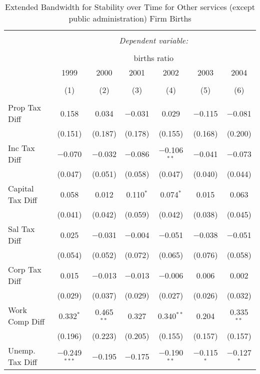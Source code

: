 
\begin{table}[!htbp] \centering 
  \caption{Extended Bandwidth for Stability over Time for  Other services (except public administration) Firm Births} 
  \label{81 ebyear} 
\small 
\begin{tabular}{@{\extracolsep{5pt}}lcccccc} 
\\[-1.8ex]\hline 
\hline \\[-1.8ex] 
 & \multicolumn{6}{c}{\textit{Dependent variable:}} \\ 
\cline{2-7} 
\\[-1.8ex] & \multicolumn{6}{c}{births ratio} \\ 
 & 1999 & 2000 & 2001 & 2002 & 2003 & 2004 \\ 
\\[-1.8ex] & (1) & (2) & (3) & (4) & (5) & (6)\\ 
\hline \\[-1.8ex] 
 Prop Tax Diff & 0.158 & 0.034 & $-$0.031 & 0.029 & $-$0.115 & $-$0.081 \\ 
  & (0.151) & (0.187) & (0.178) & (0.155) & (0.168) & (0.200) \\ 
  Inc Tax Diff & $-$0.070 & $-$0.032 & $-$0.086 & $-$0.106$^{**}$ & $-$0.041 & $-$0.073 \\ 
  & (0.047) & (0.051) & (0.058) & (0.047) & (0.040) & (0.044) \\ 
  Capital Tax Diff & 0.058 & 0.012 & 0.110$^{*}$ & 0.074$^{*}$ & 0.015 & 0.063 \\ 
  & (0.041) & (0.042) & (0.059) & (0.042) & (0.038) & (0.045) \\ 
  Sal Tax Diff & 0.025 & $-$0.031 & $-$0.004 & $-$0.051 & $-$0.038 & $-$0.051 \\ 
  & (0.054) & (0.052) & (0.072) & (0.065) & (0.076) & (0.058) \\ 
  Corp Tax Diff & 0.015 & $-$0.013 & $-$0.013 & $-$0.006 & 0.006 & 0.002 \\ 
  & (0.029) & (0.037) & (0.029) & (0.027) & (0.026) & (0.032) \\ 
  Work Comp Diff & 0.332$^{*}$ & 0.465$^{**}$ & 0.327 & 0.340$^{**}$ & 0.204 & 0.335$^{**}$ \\ 
  & (0.196) & (0.223) & (0.205) & (0.155) & (0.157) & (0.157) \\ 
  Unemp. Tax Diff & $-$0.249$^{***}$ & $-$0.195 & $-$0.175 & $-$0.190$^{**}$ & $-$0.115$^{*}$ & $-$0.127$^{*}$ \\ 

\end{tabular}
\end{table}
